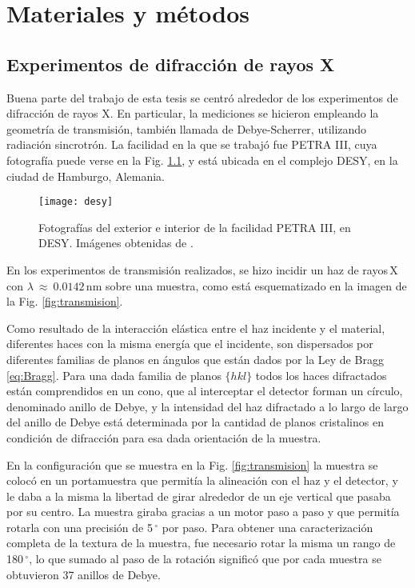 \chapter{Materiales y métodos}\label{C:Materiales}
\graphicspath{{./figs/02_Mat/}}
\section{Experimentos de difracción de rayos X}\label{S:MatXRD}
Buena parte del trabajo de esta tesis se centró alrededor de los experimentos de difracción de rayos X.
En particular, la mediciones se hicieron empleando la geometría de transmisión, también llamada de Debye-Scherrer, utilizando radiación sincrotrón.
La facilidad en la que se trabajó fue PETRA III, cuya fotografía puede verse en la Fig. \ref{fig:desyfoto}, y está ubicada en el complejo DESY, en la ciudad de Hamburgo, Alemania\cite{desy}.

\begin{figure}[!htb] 
  \centering
  \texttt{[image: desy]}
  \caption{Fotografías del exterior e interior de la facilidad PETRA III, en DESY. Imágenes obtenidas de \cite{desy}.}
  \label{fig:desyfoto}
\end{figure}

En los experimentos de transmisión realizados, se hizo incidir un haz de rayos\,X con $\lambda \ \approx \ 0.0142$\,nm sobre una muestra, como está esquematizado en la imagen de la Fig. \ref{fig:transmision}. 

Como resultado de la interacción elástica entre el haz incidente y el material, diferentes haces con la misma energía que el incidente, son dispersados por diferentes familias de planos en ángulos que están dados por la Ley de Bragg \ref{eq:Bragg}.
Para una dada familia de planos $\{hkl\}$ todos los haces difractados están comprendidos en un cono, que al interceptar el detector forman un círculo, denominado anillo de Debye, y la intensidad del haz difractado a lo largo de largo del anillo de Debye está determinada por la cantidad de planos cristalinos en condición de difracción para esa dada orientación de la muestra.

En la configuración que se muestra en la Fig. \ref{fig:transmision} la muestra se colocó en un portamuestra que permitía la alineación con el haz y el detector, y le daba a la misma la libertad de girar alrededor de un eje vertical que pasaba por su centro.
La muestra giraba gracias a un motor paso a paso y que permitía rotarla con una precisión de 5\,$^{\circ}$ por paso.
Para obtener una caracterización completa de la textura de la muestra, fue necesario rotar la misma un rango de 180\,$^{\circ}$, lo que sumado al paso de la rotación significó que por cada muestra se obtuvieron 37 anillos de Debye.

